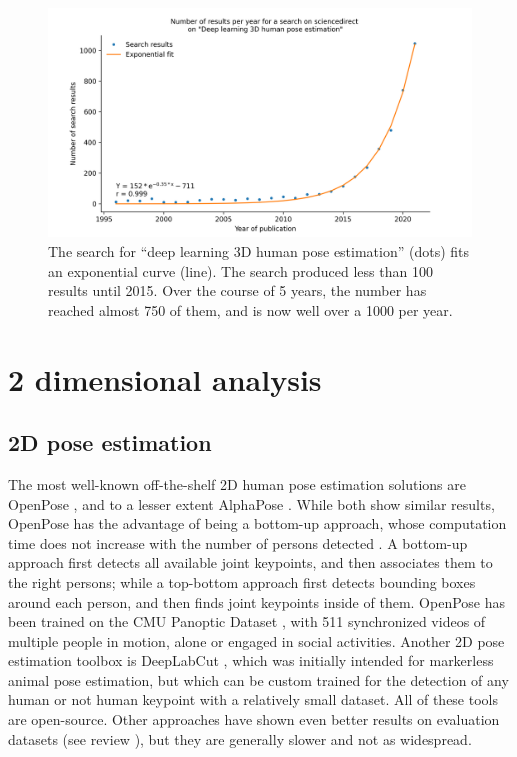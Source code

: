 \begin{figure}[hbtp]
	\centering
	\def\svgwidth{1\columnwidth}
	\fontsize{10pt}{10pt}\selectfont
	\includegraphics[width=\linewidth]{"../Chap1/Figures/Fig_exp.png"}
	\caption{The search for “deep learning 3D human pose estimation” (dots) fits an exponential curve (line). The search produced less than 100 results until 2015. Over the course of 5 years, the number has reached almost 750 of them, and is now well over a 1000 per year.}
	\label{fig_exp}
\end{figure}
\FloatBarrier

\section{2 dimensional analysis}

\FloatBarrier
\subsection{2D pose estimation}

The most well-known off-the-shelf 2D human pose estimation solutions are OpenPose \cite{Cao2019}, and to a lesser extent AlphaPose \cite{Fang2017}. While both show similar results, OpenPose has the advantage of being a bottom-up approach, whose computation time does not increase with the number of persons detected \cite{Cao2019}. A bottom-up approach first detects all available joint keypoints, and then associates them to the right persons; while a top-bottom approach first detects bounding boxes around each person, and then finds joint keypoints inside of them. OpenPose has been trained on the CMU Panoptic Dataset \cite{Joo2015}, with 511 synchronized videos of multiple people in motion, alone or engaged in social activities. Another 2D pose estimation toolbox is DeepLabCut \cite{Mathis2018}, which was initially intended for markerless animal pose estimation, but which can be custom trained for the detection of any human or not human keypoint with a relatively small dataset. All of these tools are open-source. Other approaches have shown even better results on evaluation datasets (see review \cite{Chen2020}), but they are generally slower and not as widespread.

